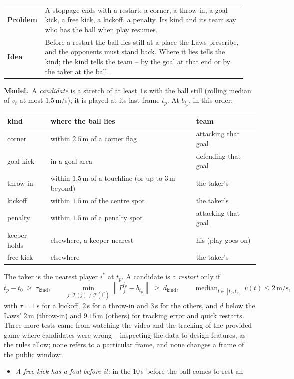 \documentclass[11pt,a4paper]{article}
\makeatletter
\newcommand{\triple}[3]{%
  \par\medskip\noindent
  \begin{tabular}{@{}p{0.13\linewidth}@{\hspace{0.6em}}p{0.82\linewidth}@{}}
  \textbf{Problem} & #1\\[0.3em]
  \textbf{Idea}    & #2
  \end{tabular}\par\smallskip\noindent
  \textbf{Model.}\ #3\par\medskip}
\newcommand{\norm}[1]{\left\lVert #1 \right\rVert}
\newcommand{\Team}{\mathcal{T}}
\makeatother
\begin{document}
\triple{A stoppage ends with a restart: a corner, a throw-in, a goal kick, a free kick, a
kickoff, a penalty. Its kind and its team say who has the ball when play resumes.}
{Before a restart the ball lies still at a place the Laws prescribe, and the opponents must
stand back. Where it lies tells the kind; the kind tells the team -- by the goal at that end
or by the taker at the ball.}
{A \emph{candidate} is a stretch of at least $1$\,s with the ball still (rolling median of
$v_t$ at most $1.5$\,m/s); it is played at its last frame $t_p$. At $b_{t_p}$, in this
order:
\begin{center}\small
\begin{tabular}{@{}lll@{}}
\toprule
kind & where the ball lies & team \\ \midrule
corner & within $2.5$\,m of a corner flag & attacking that goal \\
goal kick & in a goal area & defending that goal \\
throw-in & within $1.5$\,m of a touchline (or up to $3$\,m beyond) & the taker's \\
kickoff & within $1.5$\,m of the centre spot & the taker's \\
penalty & within $1.5$\,m of a penalty spot & attacking that goal \\
keeper holds & elsewhere, a keeper nearest & his (play goes on) \\
free kick & elsewhere & the taker's \\ \bottomrule
\end{tabular}
\end{center}
The taker is the nearest player $i^\ast$ at $t_p$. A candidate is a \emph{restart} only if
\begin{equation}
  t_p-t_0\ \ge\ \tau_{\text{kind}},\qquad
  \min_{j:\,\Team(j)\neq\Team(i^\ast)}\norm{P_j^{t_p}-b_{t_p}}\ \ge\ d_{\text{kind}},\qquad
  \operatorname{median}_{t\in[t_0,t_p]}\bar v(t)\le 2\,\text{m/s},
\end{equation}
with $\tau=1$\,s for a kickoff, $2$\,s for a throw-in and $3$\,s for the others, and $d$
below the Laws' $2$\,m (throw-in) and $9.15$\,m (others) for tracking error and quick restarts.
Three more tests came from watching the video and the tracking of the provided game where
candidates were wrong -- inspecting the data to design features, as the rules allow; none refers
to a particular frame, and none changes a frame of the public window:
\begin{itemize}[leftmargin=1.2em]
\item \emph{A free kick has a foul before it:} in the $10$\,s before the ball comes to rest an

\end{itemize}}
\end{document}
